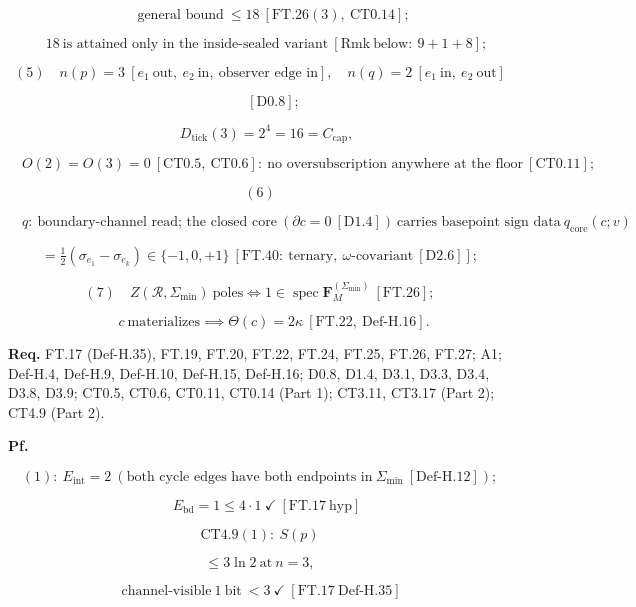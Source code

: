 \begin{theorem}
\[
\qquad \text{general bound}\ \le18\ [\mathrm{FT.26}(3),\ \mathrm{CT0.14}];
\]

\[
\quad 18\ \text{is attained only in the inside-sealed variant}\ [\mathrm{Rmk}\ \text{below}:\ 9{+}1{+}8];
\]

\[
(5)\quad n(p)=3\ [e_1\ \text{out},\ e_2\ \text{in},\ \text{observer edge in}],\quad n(q)=2\ [e_1\ \text{in},\ e_2\ \text{out}]
\]

\[
\qquad [\mathrm{D0.8}];
\]

\[
\quad D_{\mathrm{tick}}(3)=2^{4}=16=C_{\mathrm{cap}},
\]

\[
\quad O(2)=O(3)=0\ [\mathrm{CT0.5},\ \mathrm{CT0.6}]:\ \text{no oversubscription anywhere at the floor}\ [\mathrm{CT0.11}];
\]

\[
(6)
\]

\[
\quad q:\ \text{boundary-channel read; the closed core}\ (\partial c=0\ [\mathrm{D1.4}])\ \text{carries basepoint sign data}\ q_{\mathrm{core}}(c;v)
\]

\[
= \tfrac12(\sigma_{e_1}-\sigma_{e_k})\in\{-1,0,+1\}\ [\mathrm{FT.40}:\ \text{ternary},\ \omega\text{-covariant}\ [\mathrm{D2.6}]];
\]

\[
(7)\quad Z(\mathcal R,\Sigma_{\min})\ \text{poles}\iff1\in\operatorname{spec}\mathbf F_M^{(\Sigma_{\min})}\ [\mathrm{FT.26}];
\]

\[
\qquad c\ \text{materializes}\implies\Theta(c)=2\kappa\ [\mathrm{FT.22},\ \mathrm{Def\text{-}H.16}].
\]

\textbf{Req.} FT.17 (Def-H.35), FT.19, FT.20, FT.22, FT.24, FT.25, FT.26, FT.27; A1; Def-H.4, Def-H.9, Def-H.10, Def-H.15, Def-H.16; D0.8, D1.4, D3.1, D3.3, D3.4, D3.8, D3.9; CT0.5, CT0.6, CT0.11, CT0.14 (Part 1); CT3.11, CT3.17 (Part 2); CT4.9 (Part 2).

\textbf{Pf.}

\[
(1):\ E_{\mathrm{int}}=2\ (\text{both cycle edges have both endpoints in}\ \Sigma_{\min}\ [\mathrm{Def\text{-}H.12}]);
\]

\[
\quad E_{\mathrm{bd}}=1\le4\cdot1\ \checkmark\ [\mathrm{FT.17}\ \text{hyp}]
\]

\[
\mathrm{CT4.9}(1):\ S(p)
\]

\[
\le 3\ln2\ \text{at}\ n{=}3,
\]

\[
\ \text{channel-visible}\ 1\ \text{bit}\ <3\ \checkmark\ [\mathrm{FT.17}\ \text{Def-H.35}]
\]


\end{theorem}
